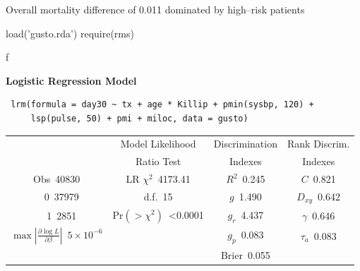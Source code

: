 \item   Overall mortality difference of 0.011 dominated by high--risk patients
\ei
\begin{Sinput}
load('gusto.rda')
require(rms)
\end{Sinput}
\begin{Sinput}
dd <- datadist(gusto); options(datadist='dd')
f <- lrm(day30 ~ tx + age * Killip + pmin(sysbp, 120) +
           lsp(pulse, 50) + pmi + miloc, data=gusto)
cat('{\\smaller ')
\end{Sinput}
{\smaller \begin{Sinput}
f
\end{Sinput}

 \centerline{\textbf{Logistic Regression Model}}
 
 \begin{verbatim}
 lrm(formula = day30 ~ tx + age * Killip + pmin(sysbp, 120) + 
     lsp(pulse, 50) + pmi + miloc, data = gusto)
 \end{verbatim}
 
 {\selectfont \begin{center}\begin{tabular}{|c|c|c|c|}\hline
&Model Likelihood&Discrimination&Rank Discrim.\\
&Ratio Test&Indexes&Indexes\\\hline
Obs~\hfill 40830&LR $\chi^{2}$~\hfill 4173.41&$R^{2}$~\hfill 0.245&$C$~\hfill 0.821\\
~~0~\hfill 37979&d.f.~\hfill 15&$g$~\hfill 1.490&$D_{xy}$~\hfill 0.642\\
~~1~\hfill 2851&Pr$(>\chi^{2})$~\hfill \textless 0.0001&$g_{r}$~\hfill 4.437&$\gamma$~\hfill 0.646\\
$\max|\frac{\partial\log L}{\partial \beta}|$~\hfill $5\!\times\!10^{-6}$&&$g_{p}$~\hfill 0.083&$\tau_{a}$~\hfill 0.083\\
&&Brier~\hfill 0.055&\\
\hline
\end{tabular}
\end{center}}
 
}

